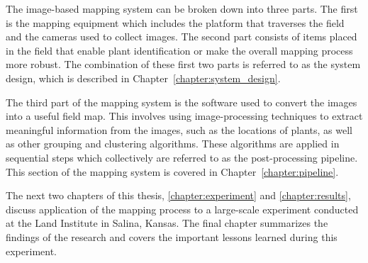 The image-based mapping system can be broken down into three parts.  The first is the mapping equipment which includes the platform that traverses the field and the cameras used to collect images.  The second part consists of items placed in the field that enable plant identification or make the overall mapping process more robust.  The combination of these first two parts is referred to as the system design, which is described in Chapter~\ref{chapter:system_design}. 

The third part of the mapping system is the software used to convert the images into a useful field map.  This involves using image-processing techniques to extract meaningful information from the images, such as the locations of plants, as well as other grouping and clustering algorithms.  These algorithms are applied in sequential steps which collectively are referred to as the post-processing pipeline.  This section of the mapping system is covered in Chapter~\ref{chapter:pipeline}. 

The next two chapters of this thesis, \ref{chapter:experiment} and \ref{chapter:results}, discuss application of the mapping process to a large-scale experiment conducted at the Land Institute in Salina, Kansas.  The final chapter summarizes the findings of the research and covers the important lessons learned during this experiment.
